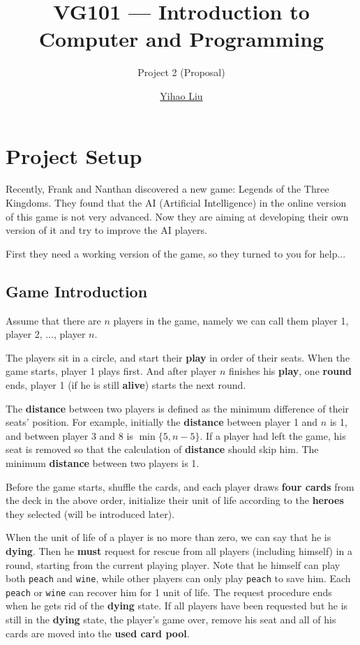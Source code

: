 \documentclass[11pt,a4paper]{article}
\title{VG101 --- Introduction to\\ Computer and Programming}
\subtitle{Project 2 (Proposal)}
\author{\href{mailto:liuyh615@sjtu.edu.cn}{Yihao Liu}}
\begin{document}
\maketitle

\section{Project Setup}

Recently, Frank and Nanthan discovered a new game: Legends of the Three Kingdoms. They found that the AI (Artificial Intelligence) in the online version of this game is not very advanced. Now they are aiming at developing their own version of it and try to improve the AI players. \bigskip

First they need a working version of the game, so they turned to you for help...

\subsection{Game Introduction}

Assume that there are $n$ players in the game, namely we can call them player 1, player 2, ..., player $n$. \bigskip

The players sit in a circle, and start their \textbf{play} in order of their seats. When the game starts, player 1 plays first. And after player $n$ finishes his \textbf{play}, one \textbf{round} ends, player 1 (if he is still \textbf{alive}) starts the next round. \bigskip

The \textbf{distance} between two players is defined as the minimum difference of their seats' position. For example, initially the \textbf{distance} between player 1 and $n$ is 1, and between player 3 and 8 is $\min\{5,n-5\}$. If a player had left the game, his seat is removed so that the calculation of \textbf{distance} should skip him. The minimum \textbf{distance} between two players is 1. \bigskip

Before the game starts, shuffle the cards, and each player draws \textbf{four cards} from the deck in the above order, initialize their unit of life according to the \textbf{heroes} they selected (will be introduced later). \bigskip

When the unit of life of a player is no more than zero, we can say that he is \textbf{dying}. Then he \textbf{must} request for rescue from all players (including himself) in a round, starting from the current playing player. Note that he himself can play both \texttt{peach} and \texttt{wine}, while other players can only play \texttt{peach} to save him. Each \texttt{peach} or \texttt{wine} can recover him for 1 unit of life. The request procedure ends when he gets rid of the \textbf{dying} state. If all players have been requested but he is still in the \textbf{dying} state, the player's game over, remove his seat and all of his cards are moved into the \textbf{used card pool}. \bigskip
\end{document}
